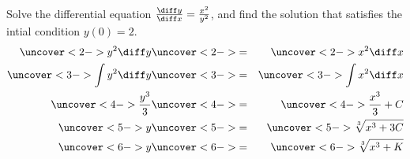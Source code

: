 \begin{frame}
\begin{example}[Example 1, p. 617]
Solve the differential equation $\frac{\diff y}{\diff x} = \frac{x^2}{y^2}$, and find the solution that satisfies the intial condition $y(0) = 2$.
\belowdisplayskip=0pt
\begin{eqnarray*}
\uncover<2->{%
y^2 \diff y %
}%
& \uncover<2->{ = } &%
\uncover<2->{%
x^2 \diff x %
}\\%
\uncover<3->{%
\int y^2 \diff y %
}%
& \uncover<3->{ = } &%
\uncover<3->{%
\int x^2 \diff x %
}\\%
\uncover<4->{%
\frac{y^3}{3}%
}%
& \uncover<4->{ = } &%
\uncover<4->{%
\frac{x^3}{3} + C
}\\%
\uncover<5->{%
y%
}%
& \uncover<5->{ = } &%
\uncover<5->{%
\sqrt[3]{x^3 + 3C}%
}\\%
\uncover<6->{%
y%
}%
& \uncover<6->{ = } &%
\uncover<6->{%
\sqrt[3]{x^3 + K}%
}%
\end{eqnarray*}
%
%
%
\end{example}
\end{frame}
